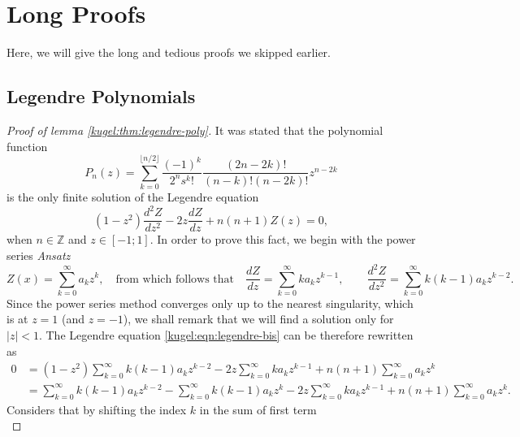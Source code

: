 \section{Long Proofs}

Here, we will give the long and tedious proofs we skipped earlier.

\subsection{Legendre Polynomials} \label{kugel:sec:proofs:legendre}

\begin{proof}[Proof of lemma \ref{kugel:thm:legendre-poly}]
  It was stated that the polynomial function
  \begin{equation*}
    P_n(z) = \sum^{\lfloor n/2 \rfloor}_{k=0}
      \frac{(-1)^k}{2^n s^k!} \frac{(2n - 2k)!}{(n - k)! (n-2k)!} z^{n - 2k}
  \end{equation*}
  is the only finite solution of the Legendre equation
  \begin{equation}
    \label{kugel:eqn:legendre-bis}
    (1 - z^2)\frac{d^2 Z}{dz^2}
    - 2z\frac{d Z}{dz}
    + n(n + 1) Z(z) = 0,
  \end{equation}
  when $n \in \mathbb{Z}$ and $z \in [-1; 1]$. In order to prove this fact, we
  begin with the power series \emph{Ansatz}
  \begin{equation*}
    Z(x) = \sum_{k=0}^\infty a_k z^k,
    \quad\text{from which follows that}\quad
    \frac{dZ}{dz} = \sum_{k=0}^\infty k a_k z^{k-1}, \qquad
    \frac{d^2 Z}{dz^2} = \sum_{k=0}^\infty k (k-1) a_k z^{k-2}.
  \end{equation*}
  Since the power series method converges only up to the nearest singularity,
  which is at $z=1$ (and $z=-1$), we shall remark that we will find a solution
  only for $|z|<1$. The Legendre equation \eqref{kugel:eqn:legendre-bis} can be
  therefore rewritten as
  \begin{align}
    0 &= (1-z^2) \sum_{k=0}^\infty k (k-1) a_k z^{k-2}
      - 2z\sum_{k=0}^\infty k a_k z^{k-1}
      + n(n+1)\sum_{k=0}^\infty a_k z^k \nonumber \\
    &= \sum_{k=0}^\infty k (k-1) a_k z^{k-2}
      - \sum_{k=0}^\infty k (k-1) a_k z^{k}
      - 2z\sum_{k=0}^\infty k a_k z^{k-1}
      + n(n+1)\sum_{k=0}^\infty a_k z^k. \label{kugel:eqn:legendre-ansatz}
  \end{align}
  Considers that by shifting the index $k$ in the sum of first term
  \begin{equation*}

\end{equation*}
\end{proof}
